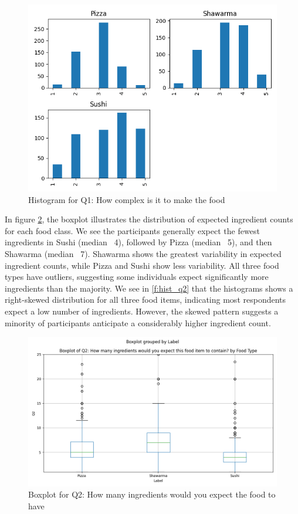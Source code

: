 \begin{figure}[h]
    \centerline{\includegraphics[width=\columnwidth]{data/histogram_Q1.png}}
    \caption{Histogram for Q1: How complex is it to make the food}
    \label{f:hist_q1}
\end{figure}

In figure \ref{f:box_q2}, the boxplot illustrates the distribution of expected ingredient counts for each food class. 
We see the participants generally expect the fewest ingredients in Sushi (median ~4), 
followed by Pizza (median ~5), and then Shawarma (median ~7). Shawarma shows the greatest variability in expected ingredient 
counts, while Pizza and Sushi show less variability. All three food types have outliers, suggesting some individuals expect 
significantly more ingredients than the majority. We see in \ref{f:hist_q2} that the histograms shows a right-skewed distribution 
for all three food items, indicating most respondents expect a low number of ingredients. 
However, the skewed pattern suggests a minority of participants anticipate a considerably higher ingredient count.

\begin{figure}[h]
    \centerline{\includegraphics[width=\columnwidth]{data/boxplot_Q2.png}}
    \caption{Boxplot for Q2: How many ingredients would you expect the food to have}
    \label{f:box_q2}
\end{figure}

